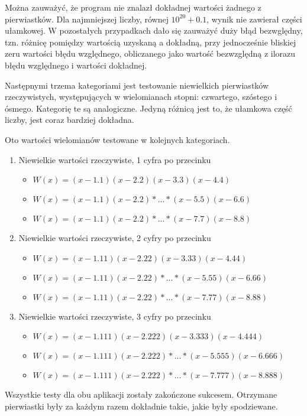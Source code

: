 Można zauważyć, że program nie znalazł dokładnej wartości żadnego z pierwiastków. Dla najmniejszej liczby, równej $10^{20}+0.1$, wynik nie zawierał części ułamkowej. W pozostałych przypadkach dało się zauważyć duży błąd bezwględny, tzn. różnicę pomiędzy wartością uzyskaną a dokładną, przy jednocześnie bliskiej zeru wartości błędu względnego, obliczanego jako wartość bezwzględną z ilorazu błędu względnego i wartości dokładnej.

Następnymi trzema kategoriami jest testowanie niewielkich pierwiastków rzeczywistych, występujących w wielomianach stopni: czwartego, szóstego i ósmego. Kategorię te są analogiczne. Jedyną różnicą jest to, że ułamkowa część liczby, jest coraz bardziej dokładna.

Oto wartości wielomianów testowane w kolejnych kategoriach.

\begin{enumerate}
	\item Niewielkie wartości rzeczywiste, 1 cyfra po przecinku
	\begin{itemize}
		\item $W(x)=(x-1.1)(x-2.2)(x-3.3)(x-4.4)$
		\item $W(x)=(x-1.1)(x-2.2)*...*(x-5.5)(x-6.6)$
		\item $W(x)=(x-1.1)(x-2.2)*...*(x-7.7)(x-8.8)$
	\end{itemize}
	\item Niewielkie wartości rzeczywiste, 2 cyfry po przecinku
	\begin{itemize}
		\item $W(x)=(x-1.11)(x-2.22)(x-3.33)(x-4.44)$
		\item $W(x)=(x-1.11)(x-2.22)*...*(x-5.55)(x-6.66)$
		\item $W(x)=(x-1.11)(x-2.22)*...*(x-7.77)(x-8.88)$
	\end{itemize}
	\item Niewielkie wartości rzeczywiste, 3 cyfry po przecinku
	\begin{itemize}
		\item $W(x)=(x-1.111)(x-2.222)(x-3.333)(x-4.444)$
		\item $W(x)=(x-1.111)(x-2.222)*...*(x-5.555)(x-6.666)$
		\item $W(x)=(x-1.111)(x-2.222)*...*(x-7.777)(x-8.888)$
	\end{itemize}
\end{enumerate}

Wszystkie testy dla obu aplikacji zostały zakończone sukcesem. Otrzymane pierwiastki były za każdym razem dokładnie takie, jakie były spodziewane.

